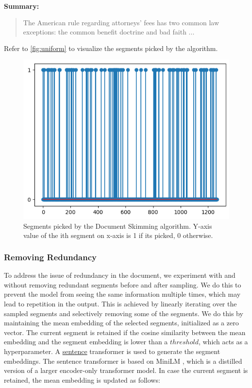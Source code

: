 		\noindent \textbf{Summary:}
		\begin{quote}
			The American rule regarding attorneys' fees has two common law exceptions: the common
			benefit doctrine and bad faith ...
		\end{quote}

		Refer to \autoref{fig:uniform} to visualize the segments picked by the algorithm.

		\begin{figure}
			\centering
			\includegraphics*[width=.45\textwidth]{Images/uniform.png}
			\caption{Segments picked by the Document Skimming algorithm. Y-axis value of the ith segment
			on x-axis is 1 if its picked, 0 otherwise.}
			\label{fig:uniform}
		\end{figure}

		\subsubsection*{Removing Redundancy}

			To address the issue of redundancy in the document, we experiment with and without removing
			redundant segments before and after sampling.
			We do this to prevent the model from seeing the same information multiple times, which may
			lead to repetition in the output.
			This is achieved by linearly iterating over the sampled segments and selectively removing some
			of the segments.
			We do this by maintaining the mean embedding of the selected segments, initialized as a zero
			vector.
			The current segment is retained if the cosine similarity between the mean embedding and the
			segment embedding is lower than a $threshold$, which acts as a hyperparameter.
			A \href{https://huggingface.co/sentence-transformers/all-MiniLM-L6-v2}{sentence} transformer
			is used to generate the segment embeddings.
			The sentence transformer is based on MiniLM \cite{wang2020minilm}, which is a distilled version
			of a larger encoder-only transformer model.
			In case the current segment is retained, the mean embedding is updated as follows:

